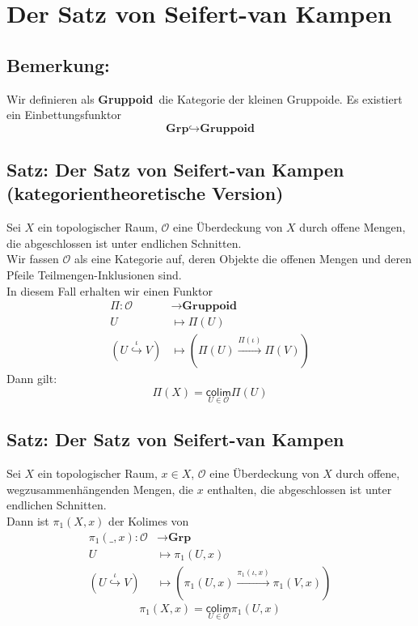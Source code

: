 \documentclass{book}
\newcommand{\klam}[1]{\left(#1\right)}
\newcommand{\Bem}[1]{\subsection{Bemerkung: #1}}
\newcommand{\Satz}[1]{\subsection{Satz: #1}}
\renewcommand{\O}{\mathcal{O}}
\newcommand{\colim}[1]{\underset{#1}{\textsf{colim}}}
\newcommand{\Grp}{\textbf{Grp}}
\newcommand{\GRP}{\textbf{Gruppoid}}
\newcommand{\pfeil}[1]{\overset{#1}{\rightarrow}}
\newcommand{\inj}[1]{\overset{#1}{\hookrightarrow}}
\begin{document}
\section{Der Satz von Seifert-van Kampen}

\Bem{}
Wir definieren als \GRP\ die Kategorie der kleinen Gruppoide. Es existiert ein Einbettungsfunktor
\[\Grp \inj{} \GRP\]

\Satz{Der Satz von Seifert-van Kampen (kategorientheoretische Version)}
Sei $X$ ein topologischer Raum, $\O$ eine Überdeckung von $X$ durch offene Mengen, die abgeschlossen ist unter endlichen Schnitten.\\
Wir fassen $\O$ als eine Kategorie auf, deren Objekte die offenen Mengen und deren Pfeile Teilmengen-Inklusionen sind.\\
In diesem Fall erhalten wir einen Funktor
\begin{align*}
\Pi : \O & \longrightarrow  \GRP\\
U & \longmapsto  \Pi(U)\\
\klam{U\inj{\iota} V} & \longmapsto  \klam{\Pi(U) \pfeil{\Pi(\iota)} \Pi(V)}
\end{align*}
Dann gilt:
\[\Pi(X) = \colim{U \in \O}\Pi(U)\]

\Satz{Der Satz von Seifert-van Kampen}
Sei $X$ ein topologischer Raum, $x \in X$, $\O$ eine Überdeckung von $X$ durch offene, wegzusammenhängenden Mengen, die $x$ enthalten, die abgeschlossen ist unter endlichen Schnitten.\\
Dann ist $\pi_1(X,x)$ der Kolimes von
\begin{align*}
\pi_1(\_, x) : \O & \longrightarrow \Grp\\
U & \longmapsto  \pi_1(U, x)\\
\klam{U\inj{\iota} V} & \longmapsto  \klam{\pi_1(U,x) \pfeil{\pi_1(\iota,x)} \pi_1(V,x)}
\end{align*}
\[\pi_1(X,x) = \colim{U \in \O}\pi_1(U,x)\]
\end{document}

